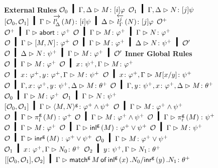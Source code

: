 {\begin{figure}[p]
 \small
  \begin{center}
\textbf{External Rules}
\vskip 2mm
\BinaryRule
   {$\hypert_0\hmid\Gamma,\Delta\tr\tj{M}{[i]\varphi}$}
   {$\hypert_1\hmid\Gamma,\Delta\tr\tj{N}{[j]\psi}$}
   {}
   {$\cotuple{\hypert_0,\hypert_1}\hmid\Gamma\tr\tj{\ltor i{l}\Delta{M}}{[i]\psi}\hmid
   \Delta\tr\tj{\rtol j{l}\Gamma {N}}{[j]\varphi}$}
\hfill
 \UnaryRule
 {$\mathcal{O}^+$}
 {}
 {$\hypert^+\hmid\Gamma\tr \tj \abort {\m\varphi}$}
\vskip 2mm
 \UnaryRule
 {$\hypert\hmid\Gamma\tr\tj M {\m\varphi}\hmid\Gamma\tr \tj N {\m\varphi}$}
 {}
 {$\hypert\hmid\Gamma\tr \tj {\cotuple{M,N}}{\m\varphi}$}
\hfill
 \UnaryRule
 {$\hypert\hmid\Gamma\tr M\colon\m\varphi\hmid\Delta\tr N\colon \m\psi\hmid \hypert'$}
 {}
 {$\hypert\hmid\Delta\tr N\colon\m\psi   \hmid\Gamma\tr M\colon \m\varphi\hmid \hypert'$}
 \vskip 2mm
\textbf{Inner Global Rules}
   \vskip 2mm
   \UnaryRule
   {$\hypert\hmid \Gamma\tr\tj M {\m\varphi}$}
   {}
   {$\hypert\hmid \tj x {\m\psi}, \Gamma\tr \tj{M}{\m\varphi}$}
   \hfill
   \UnaryRule
   {$\hypert\hmid \tj{x}{\m\varphi}, \tj{y}{\m\varphi}, \Gamma\tr \tj
   M{\m\psi}$}
   {}
   {$\hypert \hmid \tj{x}{\m\varphi}, \Gamma\tr \tj{M[x/y]}{\m\psi}$}
\vskip 2mm
\UnaryRule
   {$\hypert\hmid\Gamma,\tj x{\m\varphi},\tj y{\m\psi},\Delta\tr
   \tj M{\m\theta}$}{}
   {$\hypert\hmid\Gamma,\tj y{\m\psi},\tj x{\m\varphi},\Delta\tr \tj M{\m\theta}$} %
\hfill
\BinaryRule
   {$\hypert_0\hmid\Gamma\tr \tj M{\m\varphi}$}
   {$\hypert_1\hmid\Gamma\tr \tj N{\m\psi}$}
   {}
   {$\cotuple{\hypert_0,\hypert_1}\hmid\Gamma\tr
     \tj{\gpair{M,N}}{\m\varphi\wedge\m\psi}$}
   \vskip 2mm
  \UnaryRule
   {$\hypert\hmid\Gamma\tr M\colon\m\varphi\wedge\m\psi$}
   {}
   {$\hypert\hmid\Gamma\tr \gpil{M}\colon\m\varphi$}
   \hfill
  \UnaryRule
   {$\hypert\hmid\Gamma\tr M\colon\m\varphi\wedge\m\psi$}
   {}
   {$\hypert\hmid\Gamma\tr\gpir M\colon\m\psi$}
\vskip 2mm
  \UnaryRule
   {$\hypert\hmid\Gamma\tr M\colon\m\varphi$}
   {}
   {$\hypert\hmid\Gamma\tr\ginl{M}\colon\m\varphi\vee\m\psi$}
   \hfill
  \UnaryRule
   {$\hypert\hmid\Gamma\tr M\colon\m\psi$}
   {}
   {$\hypert\hmid\Gamma\tr \ginr{M}\colon\m\varphi\vee\m\psi$}
\vskip 2mm
\TrinaryRule
   {$\hypert_0\hmid\Gamma\tr \tj M {\m\varphi\vee\m\psi}$}
   {$\hypert_1\hmid\tj x{\m\varphi},\Gamma\tr \tj {N_0}{\m\theta}$}
   {$\hypert_2\hmid\tj y{\m\psi},   \Gamma\tr \tj {N_1}{\m\theta}$}
   {}
   {$\cotuple{\cotuple{\hypert_0,\hypert_1},\hypert_2}\hmid\Gamma \tr \tj{\gmat M x {N_0} y {N_1}}{\m\theta}$}

\end{center}
\end{figure}}
